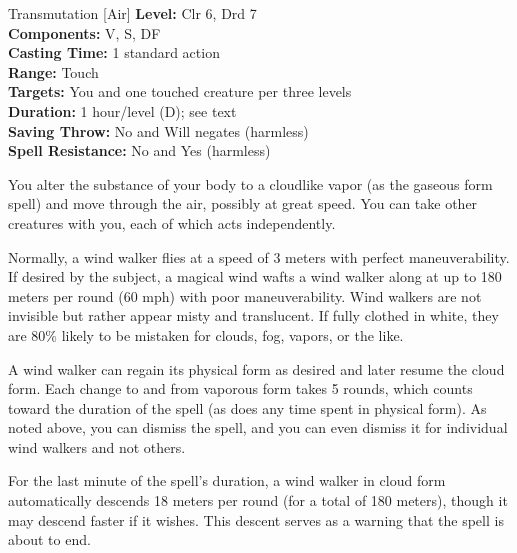 {Transmutation [Air]}
{
	\textbf{Level:}
	Clr 6, Drd 7\\
	\textbf{Components:}
	V, S, DF\\
	\textbf{Casting Time:}
	1 standard action\\
	\textbf{Range:}
	Touch\\
	\textbf{Targets:}
	You and one touched creature per three levels\\
	\textbf{Duration:}
	1 hour/level (D); see text\\
	\textbf{Saving Throw:}
	No and Will negates (harmless)\\
	\textbf{Spell Resistance:}
	No and Yes (harmless)\\
}
{
	You alter the substance of your body to a cloudlike vapor (as the gaseous form spell) and move through the air, possibly at great speed. You can take other creatures with you, each of which acts independently.

	Normally, a wind walker flies at a speed of 3 meters with perfect maneuverability. If desired by the subject, a magical wind wafts a wind walker along at up to 180 meters per round (60 mph) with poor maneuverability. Wind walkers are not invisible but rather appear misty and translucent. If fully clothed in white, they are 80\% likely to be mistaken for clouds, fog, vapors, or the like.

	A wind walker can regain its physical form as desired and later resume the cloud form. Each change to and from vaporous form takes 5 rounds, which counts toward the duration of the spell (as does any time spent in physical form). As noted above, you can dismiss the spell, and you can even dismiss it for individual wind walkers and not others.

	For the last minute of the spell's duration, a wind walker in cloud form automatically descends 18 meters per round (for a total of 180 meters), though it may descend faster if it wishes. This descent serves as a warning that the spell is about to end.

}
